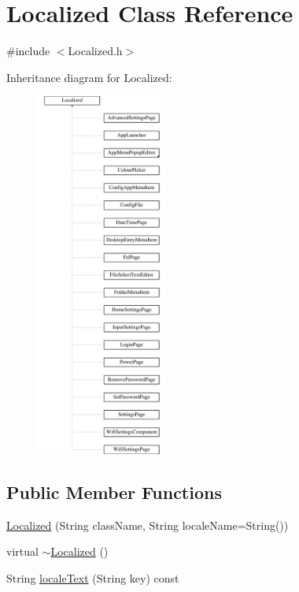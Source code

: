 \hypertarget{classLocalized}{}\section{Localized Class Reference}
\label{classLocalized}


{\ttfamily \#include $<$Localized.\+h$>$}

Inheritance diagram for Localized\+:\begin{figure}[H]
\begin{center}
\leavevmode
\includegraphics[height=12.000000cm]{classLocalized}
\end{center}
\end{figure}
\subsection*{Public Member Functions}
\begin{DoxyCompactItemize}
\item 
\mbox{\hyperlink{classLocalized_a976882f2fb6f88dfa0368b090fe6568a}{Localized}} (String class\+Name, String locale\+Name=String())
\item 
virtual \mbox{\hyperlink{classLocalized_a70d3d25b0b0714f5d2e29afc708484f6}{$\sim$\+Localized}} ()
\item 
String \mbox{\hyperlink{classLocalized_af3fe075aabb4a99fbb99d78bd157acf3}{locale\+Text}} (String key) const
\end{DoxyCompactItemize}
